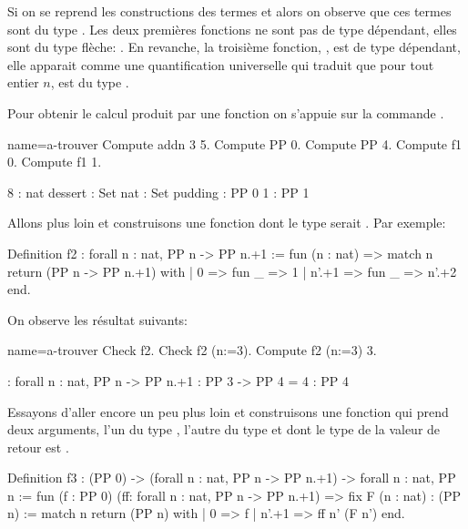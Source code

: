 \documentclass[a4paper,10pt]{article}
\begin{document}
Si on se reprend les constructions des termes  et  alors on observe que ces termes sont du
type .  Les deux premières fonctions ne sont pas de type dépendant, elles sont du type flèche:
\C{->}.  En revanche, la troisième fonction, , est de type dépendant, elle apparait comme une
quantification universelle qui traduit que pour tout entier \(n\),  est du type .

Pour obtenir le calcul produit par une fonction on s'appuie sur la commande .

\begin{coq-left}{name=a-trouver}{}
Compute addn 3 5.
Compute PP 0.
Compute PP 4.
Compute f1 0.
Compute f1 1.
\end{coq-left}
\hfill
\begin{coqout-right}
8 : nat
dessert : Set
nat : Set
pudding : PP 0
1 : PP 1
\end{coqout-right}

Allons plus loin et construisons une fonction dont le type serait .  Par
exemple:

\begin{coq}[]
Definition f2 : forall n : nat, PP n -> PP n.+1 := fun (n : nat) =>
   match n return (PP n -> PP n.+1) with
   | 0 => fun _ => 1
   | n'.+1 => fun _ => n'.+2
   end.
\end{coq}

On observe les résultat suivants:

\begin{coq-left}{name=a-trouver}{}
Check f2.
Check f2 (n:=3).
Compute f2 (n:=3) 3.
\end{coq-left}
\hfill
\begin{coqout-right}
: forall n : nat, PP n -> PP n.+1
: PP 3 -> PP 4
= 4 : PP 4
\end{coqout-right}

Essayons d'aller encore un peu plus loin et construisons une fonction qui prend deux arguments, l'un du type
, l'autre du type  et dont le type de la valeur de retour est
.

\begin{coq}[]
Definition f3 : (PP 0) -> (forall n : nat, PP n -> PP n.+1) -> forall n : nat, PP n :=
  fun (f : PP 0) (ff: forall n : nat, PP n -> PP n.+1) =>
    fix F (n : nat) : (PP n) :=
      match n return (PP n) with
      | 0 => f
      | n'.+1 => ff n' (F n')
      end.
\end{coq}
\end{document}
